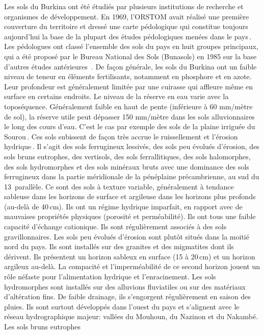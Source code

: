 \documentclass[a4paper,11pt]{article}
\begin{document}
Les sols du Burkina ont été étudiés par plusieurs institutions de
recherche et organismes de développement. En 1969, l'ORSTOM avait
réalisé une première couverture du territoire et dressé une carte
pédologique qui constitue toujours aujourd'hui la base de la plupart
des études pédologiques menées dans le pays\,\cite{BUNASOLS_1985}.
Les pédologues ont classé l'ensemble des sols du pays en huit groupes
principaux, qui a été proposé par le Bureau National des Sols
(Bunasols) en 1985 sur la base d'autres études antérieures
\,\cite{PERON_1975}. De façon générale, les sols du Burkina ont un
faible niveau de teneur en éléments fertilisants, notamment en
phosphore et en azote. Leur profondeur est généralement limitée par
une cuirasse qui affleure même en surface en certains endroits. Le
niveau de la réserve en eau varie avec la toposéquence. Généralement
faible en haut de pente (inférieure à 60 mm/mètre de sol), la réserve
utile peut dépasser 150 mm/mètre dans les sols alluvionnaires le long
des cours d'eau. C'est le cas par exemple des sols de la plaine
irriguée du Sourou\,\cite{SOMENICOU_1983}. Ces sols subissent de façon
très accrue le ruissellement et l'érosion
hydrique\,\cite{Roose_2004}. Il s'agit des sols ferrugineux lessivés,
des sols peu évolués d’érosion, des sols bruns eutrophes, des
vertisols, des sols ferrallitiques, des sols halomorphes, des sols
hydromorphes et des sols minéraux bruts avec une dominance des sols
ferrugineux dans la partie méridionale de la pénéplaine
précambrienne, au sud du 13\ieme\, parallèle. Ce sont des sols à
texture variable, généralement à tendance sableuse dans les horizons
de surface et argileuse dans les horizons plus profonds (au-delà de
40\,cm). Ils ont un régime hydrique imparfait, en rapport avec de
mauvaises propriétés physiques (porosité et perméabilité). Ils ont
tous une faible capacité d’échange cationique. Ils sont régulièrement
associés à des sols gravillonnaires. Les sols peu évolués d’érosion
sont plutôt situés dans la moitié nord du pays. Ils sont installés sur
des granites et des migmatites dont ils dérivent. Ils présentent un
horizon sableux en surface (15 à 20\,cm) et un horizon argileux
au-delà. La compacité et l’imperméabilité de ce second horizon jouent
un rôle néfaste pour l’alimentation hydrique et l’enracinement. Les
sols hydromorphes sont installés sur des alluvions fluviatiles ou sur
des matériaux d’altération fins. De faible drainage, ils s’engorgent
régulièrement en saison des pluies. Ils sont surtout développés dans
l’ouest du pays et s’alignent avec le réseau hydrographique majeur:
vallées du Mouhoun, du Nazinon et du Nakambé. Les sols bruns eutrophes
\end{document}
